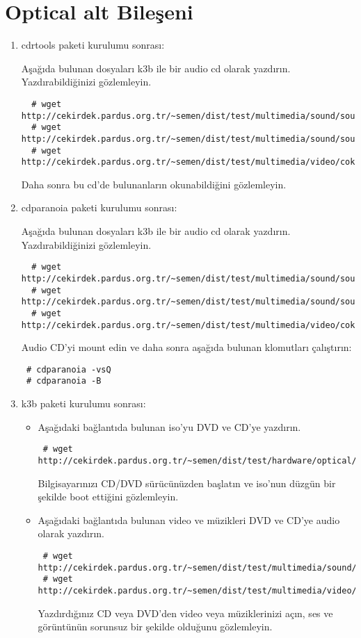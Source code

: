 \documentclass[a4paper,10pt]{article}
\begin{document}
\section{Optical alt Bileşeni}
\begin{enumerate}
 \item cdrtools paketi kurulumu sonrası:

Aşağıda bulunan dosyaları k3b ile bir audio cd olarak yazdırın. Yazdırabildiğinizi gözlemleyin.
 \begin{verbatim}
  # wget http://cekirdek.pardus.org.tr/~semen/dist/test/multimedia/sound/sound/11k16bitpcm.wav
  # wget http://cekirdek.pardus.org.tr/~semen/dist/test/multimedia/sound/sound/music.mp3
  # wget http://cekirdek.pardus.org.tr/~semen/dist/test/multimedia/video/cokluortam/linux.ogg
 \end{verbatim}

Daha sonra bu cd'de bulunanların okunabildiğini gözlemleyin.
 \item cdparanoia paketi kurulumu sonrası:

Aşağıda bulunan dosyaları k3b ile bir audio cd olarak yazdırın. Yazdırabildiğinizi gözlemleyin.
 \begin{verbatim}
  # wget http://cekirdek.pardus.org.tr/~semen/dist/test/multimedia/sound/sound/11k16bitpcm.wav
  # wget http://cekirdek.pardus.org.tr/~semen/dist/test/multimedia/sound/sound/music.mp3
  # wget http://cekirdek.pardus.org.tr/~semen/dist/test/multimedia/video/cokluortam/linux.ogg
 \end{verbatim}

Audio CD'yi mount edin ve daha sonra aşağıda bulunan klomutları çalıştırın:
\begin{verbatim}
 # cdparanoia -vsQ
 # cdparanoia -B
\end{verbatim}

\item k3b paketi kurulumu sonrası:
\begin{itemize}
\item Aşağıdaki bağlantıda bulunan iso'yu DVD ve CD'ye yazdırın. 
\begin{verbatim}
 # wget http://cekirdek.pardus.org.tr/~semen/dist/test/hardware/optical/boot.iso
\end{verbatim}

Bilgisayarınızı CD/DVD sürücünüzden başlatın ve iso'nun düzgün bir şekilde boot ettiğini gözlemleyin.

\item Aşağıdaki bağlantıda bulunan video ve müzikleri DVD ve CD'ye audio olarak yazdırın. 
\begin{verbatim}
 # wget http://cekirdek.pardus.org.tr/~semen/dist/test/multimedia/sound/sound.tar
 # wget http://cekirdek.pardus.org.tr/~semen/dist/test/multimedia/video/cokluortam.tar
\end{verbatim}
Yazdırdığınız CD veya DVD'den video veya müziklerinizi açın, ses ve görüntünün sorunsuz bir şekilde olduğunu gözlemleyin.

\end{itemize}

\end{enumerate}
\end{document}
